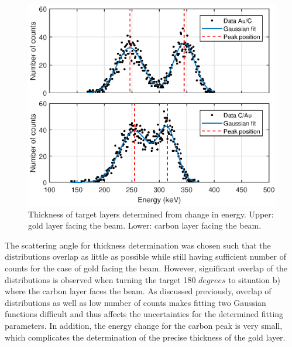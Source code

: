 


\begin{figure}[t]
\centering
\includegraphics[width=0.99\columnwidth]{Dterminethicknessplot.eps}
\caption{Thickness of target layers determined from change in energy. Upper: gold layer facing the beam. Lower: carbon layer facing the beam.}
\label{fig_thickness}
\end{figure}

The scattering angle for thickness determination was chosen such that the distributions overlap as little as possible while still having sufficient number of counts for the case of gold facing the beam. However, significant overlap of the distributions is observed when turning the target 180 $\si{degrees}$ to situation b) where the carbon layer faces the beam. As discussed previously, overlap of distributions as well as low number of counts makes fitting two Gaussian functions difficult and thus affects the uncertainties for the determined fitting parameters.  In addition, the energy change for the carbon peak is very small, which complicates the determination of the precise thickness of the gold layer.








